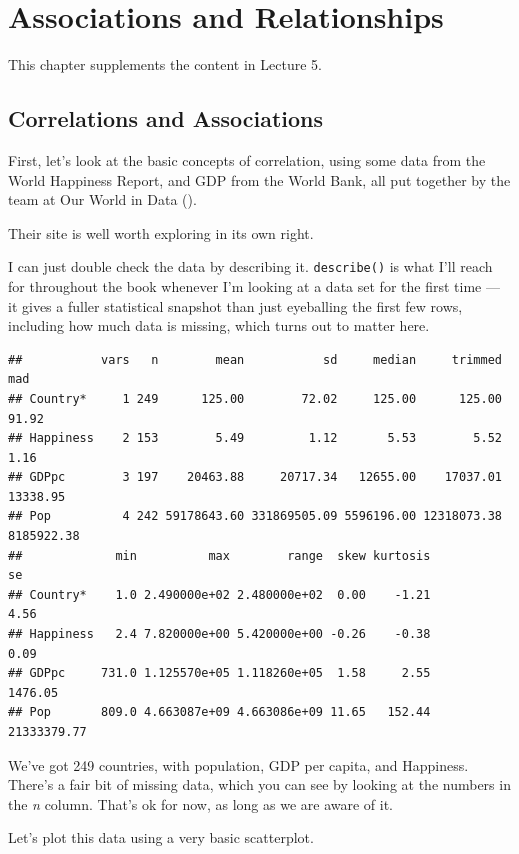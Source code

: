 \documentclass[
]{book}
\begin{document}
\chapter{Associations and Relationships}\label{assoc-rel}

This chapter supplements the content in Lecture 5.

\section{Correlations and Associations}\label{correlations-and-associations}

First, let's look at the basic concepts of correlation, using some data from the World Happiness Report, and GDP from the World Bank, all put together by the team at Our World in Data ().

Their site is well worth exploring in its own right.

I can just double check the data by describing it. \texttt{describe()} is what I'll reach for throughout the book whenever I'm looking at a data set for the first time --- it gives a fuller statistical snapshot than just eyeballing the first few rows, including how much data is missing, which turns out to matter here.

\begin{verbatim}
##           vars   n        mean           sd     median     trimmed        mad
## Country*     1 249      125.00        72.02     125.00      125.00      91.92
## Happiness    2 153        5.49         1.12       5.53        5.52       1.16
## GDPpc        3 197    20463.88     20717.34   12655.00    17037.01   13338.95
## Pop          4 242 59178643.60 331869505.09 5596196.00 12318073.38 8185922.38
##             min          max        range  skew kurtosis          se
## Country*    1.0 2.490000e+02 2.480000e+02  0.00    -1.21        4.56
## Happiness   2.4 7.820000e+00 5.420000e+00 -0.26    -0.38        0.09
## GDPpc     731.0 1.125570e+05 1.118260e+05  1.58     2.55     1476.05
## Pop       809.0 4.663087e+09 4.663086e+09 11.65   152.44 21333379.77
\end{verbatim}

We've got 249 countries, with population, GDP per capita, and Happiness. There's a fair bit of missing data, which you can see by looking at the numbers in the \emph{n} column. That's ok for now, as long as we are aware of it.

Let's plot this data using a very basic scatterplot.
\end{document}
